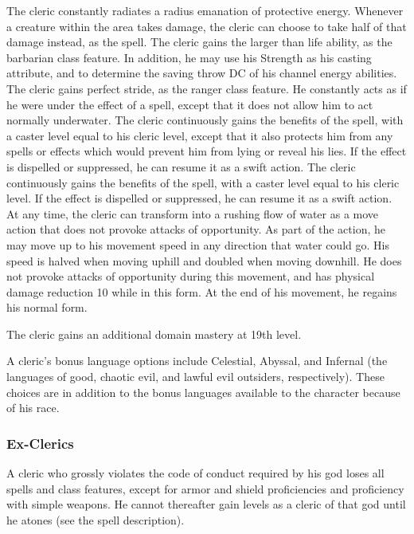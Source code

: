  The cleric constantly radiates a \areamed radius emanation of protective energy. Whenever a creature within the area takes damage, the cleric can choose to take half of that damage instead, as the  spell.
 The cleric gains the larger than life ability, as the barbarian class feature. In addition, he may use his Strength as his casting attribute, and to determine the saving throw DC of his channel energy abilities.
 The cleric gains perfect stride, as the ranger class feature. He constantly acts as if he were under the effect of a  spell, except that it does not allow him to act normally underwater.
 The cleric continuously gains the benefits of the  spell, with a caster level equal to his cleric level, except that it also protects him from any spells or effects which would prevent him from lying or reveal his lies. If the effect is dispelled or suppressed, he can resume it as a swift action.
 The cleric continuously gains the benefits of the  spell, with a caster level equal to his cleric level. If the effect is dispelled or suppressed, he can resume it as a swift action.
 At any time, the cleric can transform into a rushing flow of water as a move action that does not provoke attacks of opportunity. As part of the action, he may move up to his movement speed in any direction that water could go. His speed is halved when moving uphill and doubled when moving downhill. He does not provoke attacks of opportunity during this movement, and has physical damage reduction 10 while in this form. At the end of his movement, he regains his normal form.

\par The cleric gains an additional domain mastery at 19th level.

 A cleric's bonus language options include
Celestial, Abyssal, and Infernal (the languages of good, chaotic evil,
and lawful evil outsiders, respectively). These choices are in addition to the bonus languages available to the character because of his race.

\subsubsection{Ex-Clerics}
A cleric who grossly violates the code of conduct required by his god loses all spells and class features, except for armor and shield proficiencies and proficiency with simple weapons. He cannot thereafter gain levels as a cleric of that god until he atones (see the  spell description).

